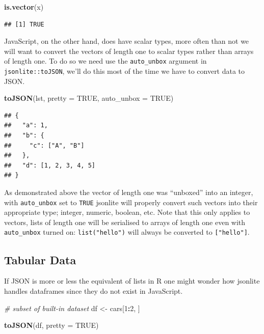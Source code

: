 \documentclass[
]{krantz}
\makeatletter
\newenvironment{Shaded}{\begin{snugshade}}{\end{snugshade}}
\newcommand{\CommentTok}[1]{\textcolor[rgb]{0.37,0.37,0.37}{\textit{#1}}}
\newcommand{\DataTypeTok}[1]{\textcolor[rgb]{0.27,0.27,0.27}{#1}}
\newcommand{\DecValTok}[1]{\textcolor[rgb]{0.06,0.06,0.06}{#1}}
\newcommand{\KeywordTok}[1]{\textcolor[rgb]{0.27,0.27,0.27}{\textbf{#1}}}
\newcommand{\NormalTok}[1]{#1}
\newcommand{\OperatorTok}[1]{\textcolor[rgb]{0.43,0.43,0.43}{\textbf{#1}}}
\newcommand{\OtherTok}[1]{\textcolor[rgb]{0.37,0.37,0.37}{#1}}
\newcommand{\StringTok}[1]{\textcolor[rgb]{0.5,0.5,0.5}{#1}}
\newenvironment{kframe}{%
\medskip{}
\setlength{\fboxsep}{.8em}
 \def\at@end@of@kframe{}%
 \ifinner\ifhmode%
  \def\at@end@of@kframe{\end{minipage}}%
  \begin{minipage}{\columnwidth}%
 \fi\fi%
 \def\FrameCommand##1{\hskip\@totalleftmargin \hskip-\fboxsep
 \colorbox{shadecolor}{##1}\hskip-\fboxsep
     \hskip-\linewidth \hskip-\@totalleftmargin \hskip\columnwidth}%
 \MakeFramed {\advance\hsize-\width
   \@totalleftmargin\z@ \linewidth\hsize
   \@setminipage}}%
 {\par\unskip\endMakeFramed%
 \at@end@of@kframe}
\renewenvironment{Shaded}{\begin{kframe}}{\end{kframe}}
\makeatother
\begin{document}
\begin{Shaded}
\begin{Highlighting}[]
\KeywordTok{is.vector}\NormalTok{(x)}
\end{Highlighting}
\end{Shaded}

\begin{verbatim}
## [1] TRUE
\end{verbatim}

JavaScript, on the other hand, does have scalar types, more often than not we will want to convert the vectors of length one to scalar types rather than arrays of length one. To do so we need use the \texttt{auto\_unbox} argument in \texttt{jsonlite::toJSON}, we'll do this most of the time we have to convert data to JSON.

\begin{Shaded}
\begin{Highlighting}[]
\KeywordTok{toJSON}\NormalTok{(lst, }\DataTypeTok{pretty =} \OtherTok{TRUE}\NormalTok{, }\DataTypeTok{auto\_unbox =} \OtherTok{TRUE}\NormalTok{)}
\end{Highlighting}
\end{Shaded}

\begin{verbatim}
## {
##   "a": 1,
##   "b": {
##     "c": ["A", "B"]
##   },
##   "d": [1, 2, 3, 4, 5]
## }
\end{verbatim}

As demonstrated above the vector of length one was ``unboxed'' into an integer, with \texttt{auto\_unbox} set to \texttt{TRUE} jsonlite will properly convert such vectors into their appropriate type; integer, numeric, boolean, etc. Note that this only applies to vectors, lists of length one will be serialised to arrays of length one even with \texttt{auto\_unbox} turned on: \texttt{list("hello")} will always be converted to \texttt{{[}"hello"{]}}.

\hypertarget{basics-tabular}{%
\subsection{Tabular Data}\label{basics-tabular}}

If JSON is more or less the equivalent of lists in R one might wonder how jsonlite handles dataframes since they do not exist in JavaScript.

\begin{Shaded}
\begin{Highlighting}[]
\CommentTok{\# subset of built{-}in dataset}
\NormalTok{df \textless{}{-}}\StringTok{ }\NormalTok{cars[}\DecValTok{1}\OperatorTok{:}\DecValTok{2}\NormalTok{, ]}

\KeywordTok{toJSON}\NormalTok{(df, }\DataTypeTok{pretty =} \OtherTok{TRUE}\NormalTok{)}
\end{Highlighting}
\end{Shaded}
\end{document}
